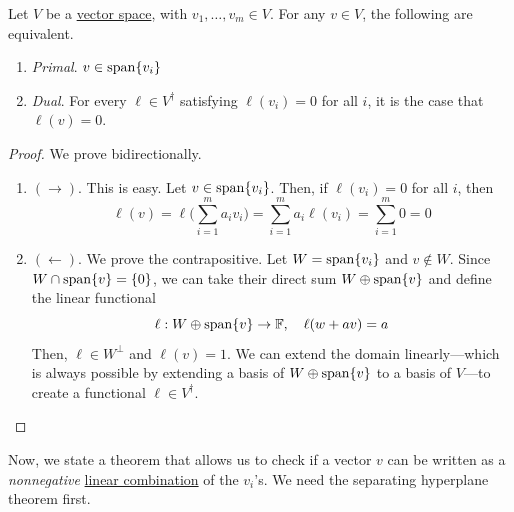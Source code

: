 	\begin{lemma}
	  \label{thm:dual-formulation-of-span}
		Let $V$ be a \hyperref[lin-def:vector-space]{vector space}, with $v_1, \ldots, v_m \in V$. For any $v \in V$, the following are equivalent. 
		\begin{enumerate}
		  \item \textit{Primal}. $v \in \operatorname{span}\{v_i\}$ 
			\item \textit{Dual}. For every $\ell \in V^\dagger$ satisfying $\ell(v_i) = 0$ for all $i$, it is the case that $\ell(v) = 0$. 
		\end{enumerate}
	\end{lemma}
	\begin{proof}
	  We prove bidirectionally. 
		\begin{enumerate}
			\item $(\rightarrow)$. This is easy. Let $v \in \operatorname{span}\{v_i\}$. Then, if $\ell(v_i) = 0$ for all $i$, then 
				\begin{equation}
					\ell(v) = \ell \bigg( \sum_{i=1}^m a_i v_i \bigg) = \sum_{i=1}^m a_i \ell(v_i) = \sum_{i=1}^m 0 = 0
				\end{equation}

			\item $(\leftarrow)$. We prove the contrapositive. Let $W = \operatorname{span}\{v_i\}$ and $v \not\in W$. Since $W \cap \operatorname{span}\{v\} = \{0\}$, we can take their direct sum $W \oplus \operatorname{span}\{v\}$ and define the linear functional 
				\begin{equation}
					\ell: W \oplus \operatorname{span}\{v\} \to \mathbb{F}, \quad \ell(w + av) = a
				\end{equation}
				Then, $\ell \in W^\perp$ and $\ell(v) = 1$. We can extend the domain linearly---which is always possible by extending a basis of $W \oplus \operatorname{span}\{v\}$ to a basis of $V$---to create a functional $\ell \in V^\dagger$. 
		\end{enumerate}
	\end{proof}

	Now, we state a theorem that allows us to check if a vector $v$ can be written as a \textit{nonnegative} \hyperref[lin-def:linear-combination]{linear combination} of the $v_i$'s. We need the separating hyperplane theorem first. 


